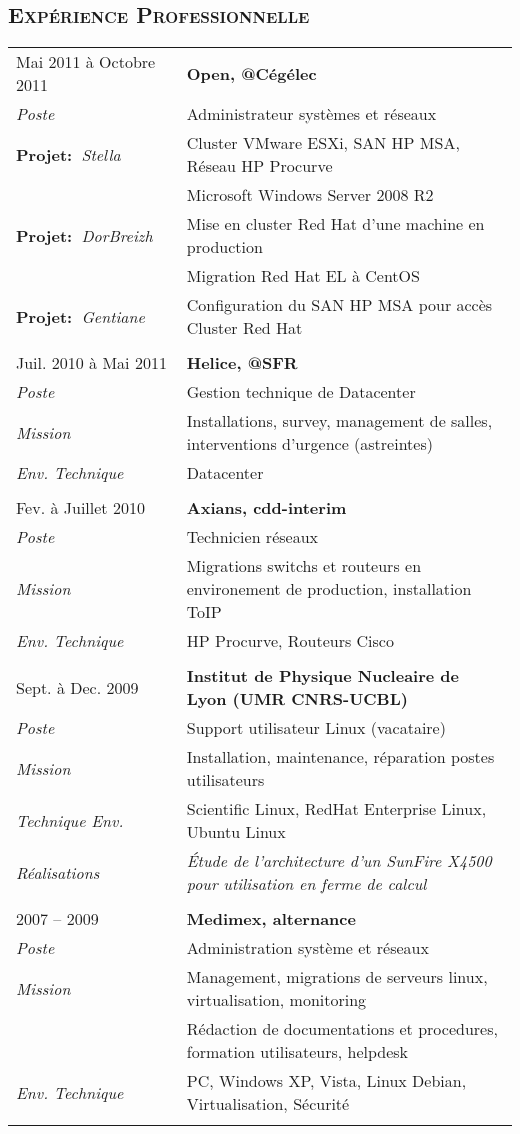 \documentclass[a4paper,8pt]{article}
\newcommand{\hsubsection}[1]{\subsection*{\fontfamily{phv}\selectfont\textsc{#1}}}
\begin{document}
\hsubsection{Expérience Professionnelle}
\begin{tabular}{P{3.5cm}|p{13cm}}
Mai 2011	à Octobre 2011     & \textbf{Open, @Cégélec}\\
\textsl{Poste}      & Administrateur systèmes et réseaux\\
\textbf{Projet:~}\textit{Stella}     & Cluster VMware ESXi, SAN HP MSA, Réseau HP Procurve \\
                    & Microsoft Windows Server 2008 R2\\
\textbf{Projet:~}\textit{DorBreizh}  & Mise en cluster Red Hat d'une machine en production\\
                    & Migration Red Hat EL à CentOS\\
\textbf{Projet:~}\textit{Gentiane}   & Configuration du SAN HP MSA pour accès Cluster Red Hat\\
 & \\
Juil. 2010	à Mai 2011	& \textbf{Helice, @SFR}\\
\textsl{Poste}			& Gestion technique de Datacenter\\
\textsl{Mission}		& Installations, survey, management de salles, interventions d'urgence (astreintes)\\
\textsl{Env. Technique}		& Datacenter\\
 & \\
Fev. à Juillet 2010		& \textbf{Axians, cdd-interim}\\
\textsl{Poste}	 		& Technicien réseaux\\
\textsl{Mission}		& Migrations switchs et routeurs en environement de production, installation ToIP\\
\textsl{Env. Technique}		& HP Procurve, Routeurs Cisco\\
 & \\
Sept. à Dec. 2009		& \textbf{Institut de Physique Nucleaire de Lyon (UMR CNRS-UCBL)}\\
\textsl{Poste}	 		& Support utilisateur Linux (vacataire)\\
\textsl{Mission} 		& Installation, maintenance, réparation postes utilisateurs\\
\textsl{Technique Env.} 	& Scientific Linux, RedHat Enterprise Linux, Ubuntu Linux\\
\textsl{Réalisations}		& \textsl{\'{E}tude de l'architecture d'un SunFire X4500 pour utilisation en ferme de calcul}\\
 & \\
2007 -- 2009 			& \textbf{Medimex, alternance}\\
\textsl{Poste}			& Administration système et réseaux\\
\textsl{Mission}		& Management, migrations de serveurs linux, virtualisation, monitoring\\
				& Rédaction de documentations et procedures, formation utilisateurs, helpdesk\\
\textsl{Env. Technique}		& PC, Windows XP, Vista, Linux Debian, Virtualisation, Sécurité\\
 & \\
\end{tabular}
\end{document}
